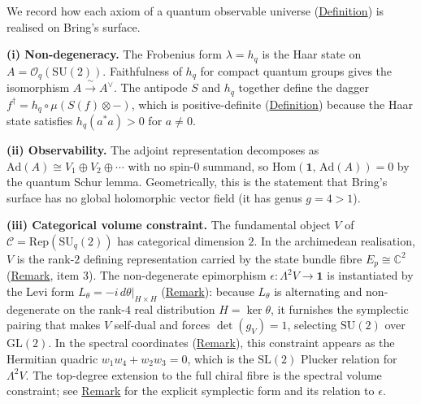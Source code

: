 \begin{remark}
  \label{rem:brings-qou-axiom-map}
We record how each axiom of a quantum observable universe
(\hyperref[def:quantum-observable-universe]{Definition}) is realised on Bring's
surface.

\textbf{(i) Non-degeneracy.}
The Frobenius form $\lambda = h_q$ is the Haar state on
$A = \mathcal{O}_q(\mathrm{SU}(2))$.  Faithfulness of $h_q$ for compact
quantum groups gives the isomorphism
$A \xrightarrow{\;\sim\;} A^{\vee}$.  The antipode $S$ and $h_q$
together define the dagger $f^{\dagger} = h_q \circ \mu(S(f) \otimes -)$,
which is positive-definite
(\hyperref[def:positive-definite-dagger]{Definition}) because the Haar state
satisfies $h_q(a^* a) > 0$ for $a \neq 0$.

\textbf{(ii) Observability.}
The adjoint representation decomposes as
$\mathrm{Ad}(A) \cong V_1 \oplus V_2 \oplus \cdots$ with no spin-$0$
summand, so $\mathrm{Hom}(\mathbf{1},\, \mathrm{Ad}(A)) = 0$ by the
quantum Schur lemma.  Geometrically, this is the statement that
Bring's surface has no global holomorphic vector field
(it has genus $g = 4 > 1$).

\textbf{(iii) Categorical volume constraint.}
The fundamental object $V$ of
$\mathcal{C} = \mathrm{Rep}(\mathrm{SU}_q(2))$ has categorical
dimension $2$.  In the archimedean realisation, $V$ is the rank-$2$
defining representation carried by the state bundle fibre
$E_p \cong \mathbb{C}^2$ (\hyperref[rem:brings-qou-4tuple]{Remark}, item 3).
The non-degenerate epimorphism $\epsilon \colon \Lambda^2 V \to \mathbf{1}$
is instantiated by the Levi form
$L_\theta = -i\,d\theta|_{H \times H}$
(\hyperref[rem:archimedean-realisations]{Remark}): because $L_\theta$ is
alternating and non-degenerate on the rank-$4$ real distribution
$H = \ker\theta$, it furnishes the symplectic pairing that makes $V$
self-dual and forces $\det(g_V) = 1$, selecting $\mathrm{SU}(2)$ over
$\mathrm{GL}(2)$.  In the spectral coordinates
(\hyperref[rem:lagrange-resolvents]{Remark}), this constraint appears as the
Hermitian quadric $w_1 w_4 + w_2 w_3 = 0$, which is the $\mathrm{SL}(2)$
Plucker relation for $\Lambda^2 V$.  The top-degree extension to the
full chiral fibre is the spectral volume
constraint; see
\hyperref[rem:seiberg-witten]{Remark} for the explicit symplectic
form and its relation to $\epsilon$.
\end{remark}

